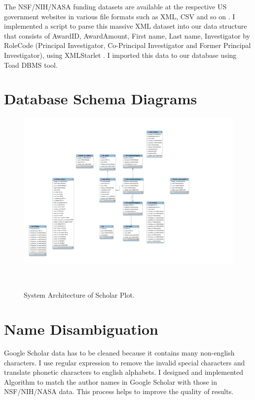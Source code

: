 The NSF/NIH/NASA funding datasets are available at the respective US government websites in various file formats such as XML, CSV and so on \cite{nsf, nih}. I implemented a script to parse this massive XML dataset into our data structure that consists of AwardID, AwardAmount, First name, Last name, Investigator by RoleCode (Principal Investigator, Co-Principal Investigator and Former Principal Investigator), using XMLStarlet \cite{XMLStarlet}. I imported this data to our database using Toad DBMS tool.

\section{Database Schema Diagrams}
\begin{figure}
\centering
  \includegraphics[width=1\columnwidth]{figures/fig_EER_Diagram.pdf}
  \caption{System Architecture of Scholar Plot.}~\label{fig:fig-arch}
\end{figure}





\section{Name Disambiguation}
Google Scholar data has to be cleaned because it contains many non-english characters. I use regular expression to remove the invalid special characters and translate phonetic characters to english alphabets. I designed and implemented Algorithm to match the author names in Google Scholar with those in NSF/NIH/NASA data. This process helps to improve the quality of results. 




